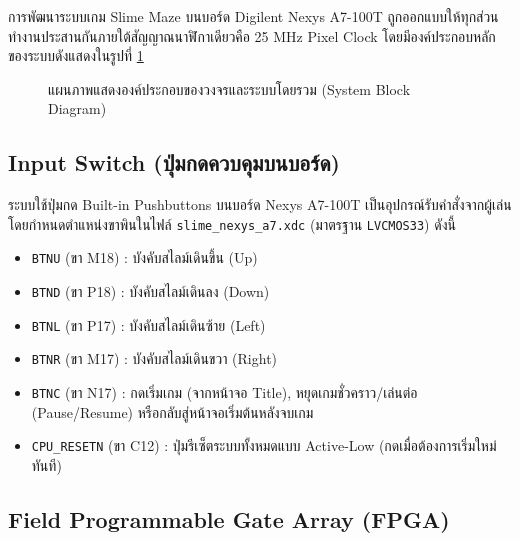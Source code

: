 
การพัฒนาระบบเกม Slime Maze บนบอร์ด Digilent Nexys A7-100T ถูกออกแบบให้ทุกส่วนทำงานประสานกันภายใต้สัญญาณนาฬิกาเดียวคือ 25 MHz Pixel Clock โดยมีองค์ประกอบหลักของระบบดังแสดงในรูปที่ \ref{fig:sys_overview}

\begin{figure}[H]
    \centering
    \caption{แผนภาพแสดงองค์ประกอบของวงจรและระบบโดยรวม (System Block Diagram)}
    \label{fig:sys_overview}
\end{figure}

\subsection{Input Switch (ปุ่มกดควบคุมบนบอร์ด)}

ระบบใช้ปุ่มกด Built-in Pushbuttons บนบอร์ด Nexys A7-100T เป็นอุปกรณ์รับคำสั่งจากผู้เล่น โดยกำหนดตำแหน่งขาพินในไฟล์ \texttt{slime\_nexys\_a7.xdc} (มาตรฐาน \texttt{LVCMOS33}) ดังนี้

\begin{itemize}[leftmargin=1.5cm]
    \item \texttt{BTNU} (ขา M18) : บังคับสไลม์เดินขึ้น (Up)
    \item \texttt{BTND} (ขา P18) : บังคับสไลม์เดินลง (Down)
    \item \texttt{BTNL} (ขา P17) : บังคับสไลม์เดินซ้าย (Left)
    \item \texttt{BTNR} (ขา M17) : บังคับสไลม์เดินขวา (Right)
    \item \texttt{BTNC} (ขา N17) : กดเริ่มเกม (จากหน้าจอ Title), หยุดเกมชั่วคราว/เล่นต่อ (Pause/Resume) หรือกลับสู่หน้าจอเริ่มต้นหลังจบเกม
    \item \texttt{CPU\_RESETN} (ขา C12) : ปุ่มรีเซ็ตระบบทั้งหมดแบบ Active-Low (กดเมื่อต้องการเริ่มใหม่ทันที)
\end{itemize}

\subsection{Field Programmable Gate Array (FPGA)}


